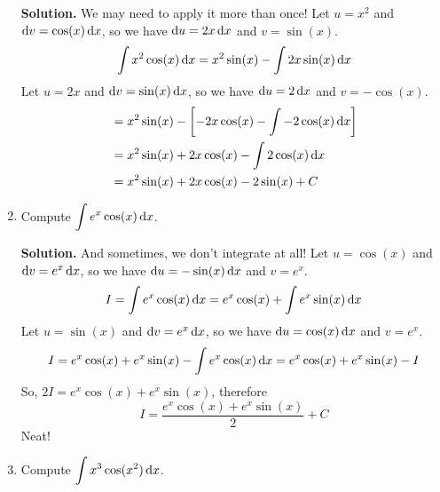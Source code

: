 \begin{Example}{}{}
\begin{enumerate}[label=(\roman*)]
              \textbf{Solution.} We may need to apply it more than once! Let $ u=x^2 $ and $ \odif{v}=\cos(x)\odif{x} $,
              so we have $ \odif{u}=2x\odif{x} $ and $ v=\sin(x) $.
              \[
                  \int x^2\cos(x)\odif{x}
                  =x^2\sin(x)-\int 2x\sin(x)\odif{x}
              \]
              Let $ u=2x $ and $ \odif{v}=\sin(x)\odif{x} $, so we have $ \odif{u}=2\odif{x} $ and $ v=-\cos(x) $.
              \begin{align*}
                   & =x^2\sin(x)-\left[-2x\cos(x)-\int -2\cos(x)\odif{x} \right] \\
                   & =x^2\sin(x)+2x\cos(x)-\int 2\cos(x)\odif{x}                 \\
                   & =x^2\sin(x)+2x\cos(x)-2\sin(x)+C
              \end{align*}
        \item Compute $ \displaystyle \int e^x\cos(x)\odif{x} $.

              \textbf{Solution.} And sometimes, we don't integrate at all! Let $ u=\cos(x) $
              and $ \odif{v}=e^x\odif{x} $, so we have $ \odif{u}=-\sin(x)\odif{x} $ and $ v=e^x $.
              \[
                  I =\int e^x\cos(x)\odif{x}
                  =e^x\cos(x)+\int e^x\sin(x)\odif{x}
              \]
              Let $ u=\sin(x) $ and $ \odif{v}=e^x\odif{x} $, so we have $ \odif{u}=\cos(x)\odif{x} $ and $ v=e^x $.
              \[
                  I=e^x\cos(x)+e^x\sin(x)-\int e^x\cos(x)\odif{x}
                  =e^x\cos(x)+e^x\sin(x)-I
              \]
              So, $ 2I=e^x\cos(x)+e^x\sin(x) $, therefore
              \[ I=\frac{e^x\cos(x)+e^x\sin(x)}{2} +C \]
              Neat!
        \item Compute $ \displaystyle \int x^3\cos(x^2)\odif{x} $.


\end{enumerate}
\end{Example}
